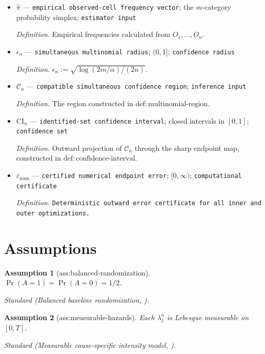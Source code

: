 \documentclass{article}
\newtheorem{assumption}{Assumption}
\begin{document}
\begin{itemize}
  \item \(\widehat\pi\) --- \texttt{empirical observed-\allowbreak{}cell frequency vector}; the \(m\)-category probability simplex; \texttt{estimator input}
  \par\smallskip\noindent\emph{Definition.} Empirical frequencies calculated from \(O_1,\ldots,O_n\).
  \item \(\epsilon_n\) --- \texttt{simultaneous multinomial radius}; \((0,1]\); \texttt{confidence radius}
  \par\smallskip\noindent\emph{Definition.} \(\epsilon_n:=\sqrt{\log(2m/\alpha)/(2n)}\).
  \item \(\mathcal C_n\) --- \texttt{compatible simultaneous confidence region}; \texttt{inference input}
  \par\smallskip\noindent\emph{Definition.} The region constructed in \(\mathrm{def{:}multinomial\text{-}region}\).
  \item \(\mathrm{CI}_n\) --- \texttt{identified-\allowbreak{}set confidence interval}; closed intervals in \([0,1]\); \texttt{confidence set}
  \par\smallskip\noindent\emph{Definition.} Outward projection of \(\mathcal C_n\) through the sharp endpoint map, constructed in \(\mathrm{def{:}confidence\text{-}interval}\).
  \item \(\varepsilon_{\mathrm{num}}\) --- \texttt{certified numerical endpoint error}; \([0,\infty)\); \texttt{computational certificate}
  \par\smallskip\noindent\emph{Definition.} \texttt{Deterministic outward error certificate for all inner and outer optimizations.}
\end{itemize}

\section{Assumptions}

\begin{assumption}[ass:balanced-randomization]\label{ass:balanced-randomization}
\(\Pr(A=1)=\Pr(A=0)=1/2\).
\par\smallskip\noindent\emph{Standard} (Balanced baseline randomization, \cite{StensrudYoungDidelezRobinsHernan2022}).
\end{assumption}

\begin{assumption}[ass:measurable-hazards]\label{ass:measurable-hazards}
Each \(\lambda_j^a\) is Lebesgue measurable on \([0,T]\).
\par\smallskip\noindent\emph{Standard} (Measurable cause-specific intensity model, \cite{MartinussenStensrud2023}).
\end{assumption}
\end{document}
